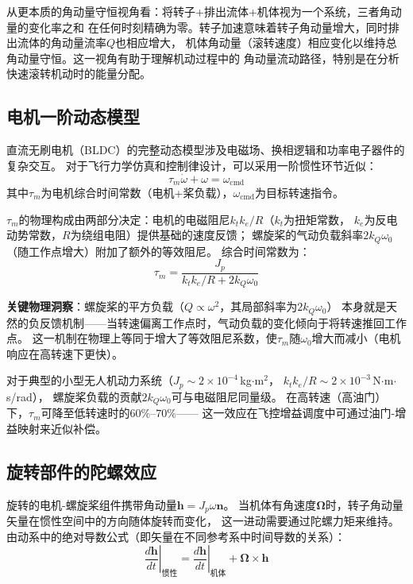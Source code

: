 \documentclass[a4paper,12pt]{ctexart}
\theoremstyle{plain}
\theoremstyle{definition}
\begin{document}
从更本质的角动量守恒视角看：将转子+排出流体+机体视为一个系统，三者角动量的变化率之和
在任何时刻精确为零。转子加速意味着转子角动量增大，同时排出流体的角动量流率$Q$也相应增大，
机体角动量（滚转速度）相应变化以维持总角动量守恒。这一视角有助于理解机动过程中的
角动量流动路径，特别是在分析快速滚转机动时的能量分配。

\subsection{电机一阶动态模型}

直流无刷电机（BLDC）的完整动态模型涉及电磁场、换相逻辑和功率电子器件的复杂交互。
对于飞行力学仿真和控制律设计，可以采用一阶惯性环节近似\cite{ducard2011fault}：
\begin{equation}
    \tau_m \dot{\omega} + \omega = \omega_{\text{cmd}}
    \label{eq:motor_lag}
\end{equation}
其中$\tau_m$为电机综合时间常数（电机+桨负载），$\omega_{\text{cmd}}$为目标转速指令。

$\tau_m$的物理构成由两部分决定：电机的电磁阻尼$k_t k_e / R$（$k_t$为扭矩常数，
$k_e$为反电动势常数，$R$为绕组电阻）提供基础的速度反馈；
螺旋桨的气动负载斜率$2 k_Q \omega_0$（随工作点增大）附加了额外的等效阻尼。
综合时间常数为：
\begin{equation}
    \tau_m = \frac{J_p}{k_t k_e / R + 2 k_Q \omega_0}
    \label{eq:tau_m}
\end{equation}

\textbf{关键物理洞察}：螺旋桨的平方负载（$Q \propto \omega^2$，其局部斜率为$2 k_Q \omega_0$）
本身就是天然的负反馈机制——当转速偏离工作点时，气动负载的变化倾向于将转速推回工作点。
这一机制在物理上等同于增大了等效阻尼系数，使$\tau_m$随$\omega_0$增大而减小（电机响应在高转速下更快）。

对于典型的小型无人机动力系统（$J_p \sim 2 \times 10^{-4}$\,kg$\cdot$m$^2$，
$k_t k_e / R \sim 2 \times 10^{-3}$\,N$\cdot$m$\cdot$s/rad），
螺旋桨负载的贡献$2 k_Q \omega_0$可与电磁阻尼同量级。
在高转速（高油门）下，$\tau_m$可降至低转速时的$60\%$--$70\%$——
这一效应在飞控增益调度中可通过油门-增益映射来近似补偿。

\subsection{旋转部件的陀螺效应}

旋转的电机-螺旋桨组件携带角动量$\bm{h} = J_p \omega \bm{n}$。
当机体有角速度$\bm{\Omega}$时，转子角动量矢量在惯性空间中的方向随体旋转而变化，
这一进动需要通过陀螺力矩来维持。由动系中的绝对导数公式（即矢量在不同参考系中时间导数的关系）：
\begin{equation}
    \left. \frac{d\bm{h}}{dt} \right|_{\text{惯性}}
    = \left. \frac{d\bm{h}}{dt} \right|_{\text{机体}}
    + \bm{\Omega} \times \bm{h}
    \label{eq:absolute_derivative}
\end{equation}
\end{document}
